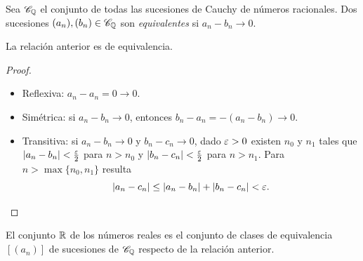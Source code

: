 \begin{definition}
  Sea \(\mathscr{C}_{\mathbb{Q}}\) el conjunto de todas las sucesiones de Cauchy de números racionales. Dos sucesiones \({(a_n)}, {(b_n)} \in \mathscr{C}_{\mathbb{Q}}\) son \emph{equivalentes} si \(a_n - b_n \to 0\).
\end{definition}

\begin{prop}
  La relación anterior es de equivalencia.
\end{prop}

\begin{proof}
  \begin{itemize}
    \item Reflexiva: \(a_n - a_n = 0 \to 0\).
    \item Simétrica: si \(a_n - b_n \to 0\), entonces \(b_n - a_n = -(a_n - b_n) \to 0\).
    \item Transitiva: si \(a_n - b_n \to 0\) y \(b_n - c_n \to 0\), dado \(\varepsilon > 0\) existen \(n_0\) y \(n_1\) tales que \(|a_n - b_n| < \frac{\varepsilon}{2}\) para \(n > n_0\) y \(|b_n - c_n| < \frac{\varepsilon}{2}\) para \(n > n_1\). Para \(n > \max\{n_0, n_1\}\) resulta
          \[
            |a_n - c_n| \leq |a_n - b_n| + |b_n - c_n| < \varepsilon. \qedhere
          \]
  \end{itemize}
\end{proof}

\begin{definition}
  El conjunto \(\mathbb{R}\) de los números reales es el conjunto de clases de equivalencia \([(a_n)]\) de sucesiones de \(\mathscr{C}_{\mathbb{Q}}\) respecto de la relación anterior.
\end{definition}
